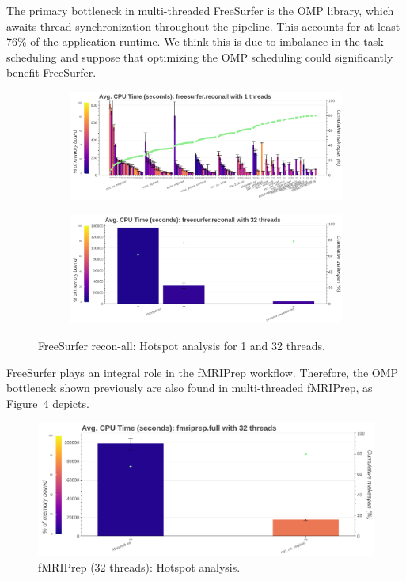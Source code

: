 \documentclass[conference]{IEEEtran}
\begin{document}
The primary bottleneck in multi-threaded FreeSurfer is the OMP library, which awaits thread synchronization throughout the pipeline. This accounts for at least 76\% of the application runtime. We think this is due to imbalance in the task scheduling and suppose that optimizing the OMP scheduling could significantly benefit FreeSurfer.
\begin{figure}[ht!]
	\centering
	\begin{subfigure}[t]{\linewidth}
		\caption{}
		\label{subfig:hotspots-1thread-freesurfer-reconall}
		\includegraphics[width=\linewidth]{figures/hotspots-1thread-freesurfer-reconall.png}
	\end{subfigure}
	\begin{subfigure}[t]{\linewidth}
		\caption{}
		\label{subfig:hotspots-32threads-freesurfer-reconall}
		\includegraphics[width=\linewidth]{figures/hotspots-32threads-freesurfer-reconall.png}
	\end{subfigure}
	\caption{FreeSurfer recon-all: Hotspot analysis for 1 and 32 threads.}
	\label{fig:hotspots-freesurfer-reconall}
\end{figure}

FreeSurfer plays an integral role in the fMRIPrep workflow. Therefore, the OMP bottleneck shown previously are also found in multi-threaded fMRIPrep, as Figure~\ref{fig:hotspots-fmriprep-32threads} depicts.
\begin{figure}[ht!]
	\centering
	\includegraphics[width=\linewidth]{figures/hotspots-32threads-fmriprep-full.png}
	\caption{fMRIPrep (32 threads): Hotspot analysis.}
	\label{fig:hotspots-fmriprep-32threads}
\end{figure}
	
\end{document}
